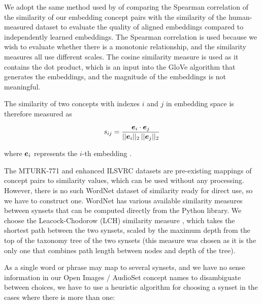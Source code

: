 We adopt the same method used by \cite{mturk771} of comparing the Spearman correlation of the similarity of our embedding concept pairs with the similarity of the human-measured dataset to evaluate the quality of aligned embeddings compared to independently learned embeddings. The Spearman correlation is used because we wish to evaluate whether there is a monotonic relationship, and the similarity measures all use different scales. The cosine similarity measure is used as it contains the dot product, which is an input into the GloVe algorithm that generates the embeddings, and the magnitude of the embeddings is not meaningful. 

The similarity of two concepts with indexes $i$ and $j$ in embedding space is therefore measured as

\begin{equation}
s_{ij} = \frac{\boldsymbol{e}_i \cdot \boldsymbol{e}_j}{||\boldsymbol{e}_i||_2 \medspace ||\boldsymbol{e}_j||_2}
\end{equation}

where $\boldsymbol{e}_i$ represents the $i$-th embedding .

The MTURK-771 and enhanced ILSVRC datasets are pre-existing mappings of concept pairs to similarity values, which can be used without any processing. However, there is no such WordNet dataset of similarity ready for direct use, so we have to construct one. WordNet has various available similarity measures between synsets that can be computed directly from the Python library. We choose the Leacock-Chodorow (LCH) similarity measure \cite{LeacockChodorow}, which takes the shortest path between the two synsets, scaled by the maximum depth from the top of the taxonomy tree of the two synsets (this measure was chosen as it is the only one that combines path length between nodes and depth of the tree).  

As a single word or phrase may map to several synsets, and we have no sense information in our Open Images / AudioSet concept names to disambiguate between choices, we have to use a heuristic algorithm for choosing a synset in the cases where there is more than one:


